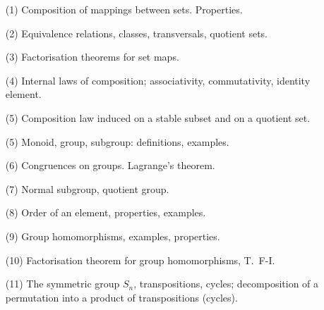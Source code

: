 \begin{enumerate}
\item[(1)] Composition of mappings between sets. Properties.
\item[(2)] Equivalence relations, classes, transversals, quotient sets.
\item[(3)] Factorisation theorems for set maps.
\item[(4)] Internal laws of composition; associativity, commutativity, identity element.
\item[(5)] Composition law induced on a stable subset and on a quotient set.
\item[(5)] Monoid, group, subgroup: definitions, examples.
\item[(6)] Congruences on groups. Lagrange's theorem.
\item[(7)] Normal subgroup, quotient group.
\item[(8)] Order of an element, properties, examples.
\item[(9)] Group homomorphisms, examples, properties.
\item[(10)] Factorisation theorem for group homomorphisms, T.~F-I.
\item[(11)] The symmetric group $S_n$, transpositions, cycles; decomposition of a
permutation into a product of transpositions (cycles).
\end{enumerate}
